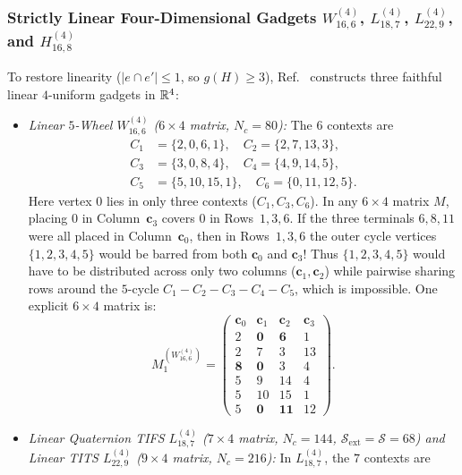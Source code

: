 \documentclass[aps,pra,reprint,superscriptaddress,longbibliography,nofootinbib,floatfix,10pt]{revtex4-2}
\theoremstyle{definition}\newtheorem{definition}[theorem]{Definition}
\theoremstyle{remark}\newtheorem{remark}[theorem]{Remark}
\newcommand{\Sc}{\mathcal S}\newcommand{\Cc}{\mathcal C}
\begin{document}
\subsubsection{Strictly Linear Four-Dimensional Gadgets \texorpdfstring{$W_{16,6}^{(4)}$, $L_{18,7}^{(4)}$, $L_{22,9}^{(4)}$, and $H_{16,8}^{(4)}$}{W16,6(4), L18,7(4), L22,9(4), and H16,8(4)}}
To restore linearity ($|e\cap e'|\le 1$, so $g(H)\ge 3$), Ref.~\cite{svozil2026contexts} constructs three faithful linear $4$-uniform gadgets in $\mathbb R^4$:
\begin{itemize}
\item \emph{Linear $5$-Wheel $W_{16,6}^{(4)}$ ($6\times 4$ matrix, $N_c=80$):} The $6$ contexts are
\[
\begin{aligned}
C_1&=\{2,0,6,1\},\quad C_2=\{2,7,13,3\},\\
C_3&=\{3,0,8,4\},\quad C_4=\{4,9,14,5\},\\
C_5&=\{5,10,15,1\},\quad C_6=\{0,11,12,5\}.
\end{aligned}
\]
Here vertex $0$ lies in only three contexts ($C_1,C_3,C_6$). In any $6\times 4$ matrix $M$, placing $0$ in Column~$\mathbf{c}_3$ covers $0$ in Rows~$1,3,6$. If the three terminals $6,8,11$ were all placed in Column~$\mathbf{c}_0$, then in Rows~$1,3,6$ the outer cycle vertices $\{1,2,3,4,5\}$ would be barred from both $\mathbf{c}_0$ and $\mathbf{c}_3$! Thus $\{1,2,3,4,5\}$ would have to be distributed across only two columns ($\mathbf{c}_1,\mathbf{c}_2$) while pairwise sharing rows around the $5$-cycle $C_1-C_2-C_3-C_4-C_5$, which is impossible. One explicit $6\times4$ matrix is:
\begin{equation}\label{eq:W16-matrix}
M_1^{(W_{16,6}^{(4)})}=\begin{pmatrix}
\mathbf{c}_0 & \mathbf{c}_1 & \mathbf{c}_2 & \mathbf{c}_3\\\hline
2 & \mathbf{0} & \mathbf{6} & 1\\
2 & 7 & 3 & 13\\
\mathbf{8} & \mathbf{0} & 3 & 4\\
5 & 9 & 14 & 4\\
5 & 10 & 15 & 1\\
5 & \mathbf{0} & \mathbf{11} & 12
\end{pmatrix}.
\end{equation}
\item \emph{Linear Quaternion TIFS $L_{18,7}^{(4)}$ ($7\times 4$ matrix, $N_c=144$, $\Sc_{\mathrm{ext}}=\Sc=68$) and Linear TITS $L_{22,9}^{(4)}$ ($9\times 4$ matrix, $N_c=216$):} In $L_{18,7}^{(4)}$, the $7$ contexts are

\end{itemize}
\end{document}
